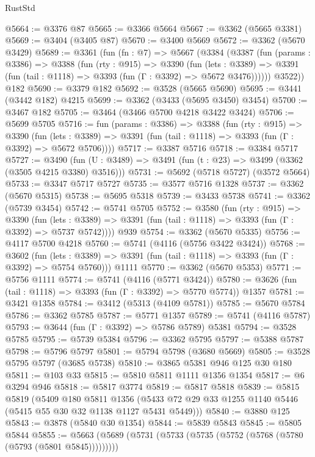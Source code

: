 \begin{lexlean}{RustStd}
\begin{coremodule}
@5664 := @3376 @87
@5665 := @3366 @5664
@5667 := @3362 (@5665 @3381)
@5669 := @3404 (@3405 @87)
@5670 := @3400 @5669
@5672 := @3362 (@5670 @3429)
@5689 := @3361
    (fun (fn : @7) =>
    @5667
      (@3384
        (@3387
          (fun (params : @3386) =>
          @3388
            (fun (rty : @915) =>
            @3390
              (fun (lets : @3389) =>
              @3391 (fun (tail : @1118) => @3393 (fun (Γ : @3392) => @5672 @3476))))))
        @3522))
    @182
@5690 := @3379 @182
@5692 := @3528 (@5665 @5690)
@5695 := @3441 (@3442 @182) @4215
@5699 := @3362 (@3433 (@5695 @3450) @3454)
@5700 := @3467 @182
@5705 := @3464 (@3466 @5700 @4218 @3422 @3424)
@5706 := @5699 @5705
@5716 := fun (params : @3386) =>
  @3388
    (fun (rty : @915) =>
    @3390
      (fun (lets : @3389) => @3391 (fun (tail : @1118) => @3393 (fun (Γ : @3392) => @5672 @5706))))
@5717 := @3387 @5716
@5718 := @3384 @5717
@5727 := @3490 (fun (U : @3489) => @3491 (fun (t : @23) => @3499 (@3362 (@3505 @4215 @3380) @3516)))
@5731 := @5692 (@5718 @5727) (@3572 @5664)
@5733 := @3347 @5717 @5727
@5735 := @3577 @5716 @1328
@5737 := @3362 (@5670 @5315)
@5738 := @5695 @5318
@5739 := @3433 @5738
@5741 := @3362 (@5739 @3454)
@5742 := @5741 @5705
@5752 := @3580
    (fun (rty : @915) =>
    @3390
      (fun (lets : @3389) => @3391 (fun (tail : @1118) => @3393 (fun (Γ : @3392) => @5737 @5742))))
    @939
@5754 := @3362 (@5670 @5335)
@5756 := @4117 @5700 @4218
@5760 := @5741 (@4116 (@5756 @3422 @3424))
@5768 := @3602
    (fun (lets : @3389) => @3391 (fun (tail : @1118) => @3393 (fun (Γ : @3392) => @5754 @5760)))
    @1111
@5770 := @3362 (@5670 @5353)
@5771 := @5756 @1111
@5774 := @5741 (@4116 (@5771 @3424))
@5780 := @3626 (fun (tail : @1118) => @3393 (fun (Γ : @3392) => @5770 @5774)) @1357
@5781 := @3421 @1358
@5784 := @3412 (@5313 (@4109 @5781))
@5785 := @5670 @5784
@5786 := @3362 @5785
@5787 := @5771 @1357
@5789 := @5741 (@4116 @5787)
@5793 := @3644 (fun (Γ : @3392) => @5786 @5789) @5381
@5794 := @3528 @5785
@5795 := @5739 @5384
@5796 := @3362 @5795
@5797 := @5388 @5787
@5798 := @5796 @5797
@5801 := @5794 @5798 (@3680 @5669)
@5805 := @3528 @5795 @5797 (@3685 @5738)
@5810 := @3865 @5381 @946 @125 @30 @180
@5811 := @103 @33
@5815 := @5810 @5811 @1111 @1356 @1354
@5817 := @6 @3294 @946
@5818 := @5817 @3774
@5819 := @5817 @5818
@5839 := @5815
    @5819
    (@5409
      @180
      @5811
      @1356
      (@5433 @72 @29 @33 @1255 @1140 @5446 (@5415 @55 @30 @32 @1138 @1127 @5431 @5449)))
@5840 := @3880 @125
@5843 := @3878 (@5840 @30 @1354)
@5844 := @5839 @5843
@5845 := @5805 @5844
@5855 := @5663 (@5689 (@5731 (@5733 (@5735 (@5752 (@5768 (@5780 (@5793 (@5801 @5845)))))))))

\end{coremodule}
\end{lexlean}
